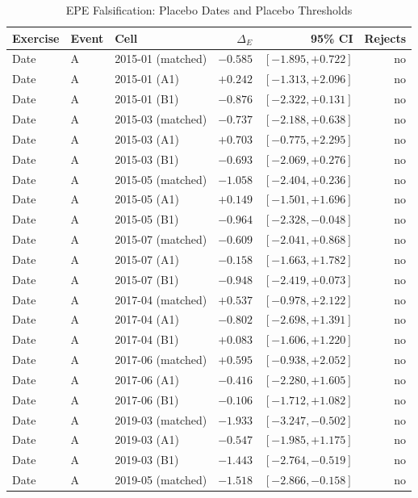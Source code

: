 \begin{table}[H]
\centering
\caption{EPE Falsification: Placebo Dates and Placebo Thresholds}
\label{tab:epe_placebo}
\small
\begin{tabular}{lllrrr}
\toprule
Exercise & Event & Cell & $\Delta_E$ & 95\% CI & Rejects \\
\midrule
Date & A & 2015-01 (matched) & $-0.585$ & $[-1.895, +0.722]$ & no \\
Date & A & 2015-01 (A1) & $+0.242$ & $[-1.313, +2.096]$ & no \\
Date & A & 2015-01 (B1) & $-0.876$ & $[-2.322, +0.131]$ & no \\
Date & A & 2015-03 (matched) & $-0.737$ & $[-2.188, +0.638]$ & no \\
Date & A & 2015-03 (A1) & $+0.703$ & $[-0.775, +2.295]$ & no \\
Date & A & 2015-03 (B1) & $-0.693$ & $[-2.069, +0.276]$ & no \\
Date & A & 2015-05 (matched) & $-1.058$ & $[-2.404, +0.236]$ & no \\
Date & A & 2015-05 (A1) & $+0.149$ & $[-1.501, +1.696]$ & no \\
Date & A & 2015-05 (B1) & $-0.964$ & $[-2.328, -0.048]$ & no \\
Date & A & 2015-07 (matched) & $-0.609$ & $[-2.041, +0.868]$ & no \\
Date & A & 2015-07 (A1) & $-0.158$ & $[-1.663, +1.782]$ & no \\
Date & A & 2015-07 (B1) & $-0.948$ & $[-2.419, +0.073]$ & no \\
Date & A & 2017-04 (matched) & $+0.537$ & $[-0.978, +2.122]$ & no \\
Date & A & 2017-04 (A1) & $-0.802$ & $[-2.698, +1.391]$ & no \\
Date & A & 2017-04 (B1) & $+0.083$ & $[-1.606, +1.220]$ & no \\
Date & A & 2017-06 (matched) & $+0.595$ & $[-0.938, +2.052]$ & no \\
Date & A & 2017-06 (A1) & $-0.416$ & $[-2.280, +1.605]$ & no \\
Date & A & 2017-06 (B1) & $-0.106$ & $[-1.712, +1.082]$ & no \\
Date & A & 2019-03 (matched) & $-1.933$ & $[-3.247, -0.502]$ & no \\
Date & A & 2019-03 (A1) & $-0.547$ & $[-1.985, +1.175]$ & no \\
Date & A & 2019-03 (B1) & $-1.443$ & $[-2.764, -0.519]$ & no \\
Date & A & 2019-05 (matched) & $-1.518$ & $[-2.866, -0.158]$ & no \\

\end{tabular}
\end{table}
